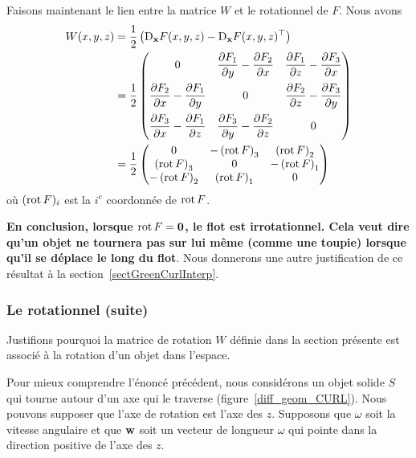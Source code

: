 {Faisons maintenant le lien entre la matrice $W$ et le rotationnel de
$F$.  Nous avons
\begin{align*}
W(x,y,z)
&= \frac{1}{2}
\left( \mathrm{D}_{\mathbf{x}} F(x,y,z) -
\mathrm{D}_{\mathbf{x}} F(x,y,z)^\top \right) \\
&= \frac{1}{2}
\begin{pmatrix}
0 & \displaystyle \frac{\partial F_1}{\partial y} - \frac{\partial F_2}{\partial x} &
\displaystyle \frac{\partial F_1}{\partial z} - \frac{\partial F_3}{\partial x} \\[1em]
\displaystyle \frac{\partial F_2}{\partial x} - \frac{\partial F_1}{\partial y} & 0 &
\displaystyle \frac{\partial F_2}{\partial z} - \frac{\partial F_3}{\partial y} \\[1em]
\displaystyle \frac{\partial F_3}{\partial x} - \frac{\partial F_1}{\partial z} &
\displaystyle \frac{\partial F_3}{\partial y} - \frac{\partial F_2}{\partial z} & 0
\end{pmatrix} \\
&= \frac{1}{2}
\begin{pmatrix}
0 & \displaystyle -\left(\operatorname{rot} F\right)_3 &
\displaystyle \left(\operatorname{rot} F\right)_2 \\
\displaystyle \left(\operatorname{rot} F\right)_3 & 0 &
\displaystyle -\left(\operatorname{rot} F\right)_1 \\
\displaystyle -\left(\operatorname{rot} F\right)_2 & 
\displaystyle \left(\operatorname{rot} F\right)_1 & 0
\end{pmatrix}
\end{align*}
où $(\operatorname{rot} F)_i$ est la $i^e$ coordonnée de
$\operatorname{rot} F$.

{\bfseries En conclusion, lorsque
$\operatorname{rot} F = \mathbf{0}$, le flot est irrotationnel.  Cela veut dire
qu'un objet ne tournera pas sur lui même (comme une toupie) lorsque
qu'il se déplace le long du flot}.  Nous donnerons une autre justification
de ce résultat à la section~\ref{sectGreenCurlInterp}.

\subsubsection{Le rotationnel (suite)}

Justifions pourquoi la matrice de rotation $W$ définie dans la section
présente est associé à la rotation d'un objet dans l'espace.

Pour mieux comprendre l'énoncé précédent, nous considérons un objet
solide $S$ qui tourne autour d'un axe qui le traverse
(figure~\ref{diff_geom_CURL}).  Nous pouvons supposer que
l'axe de rotation est l'axe des $z$.  Supposons que
$\omega$ soit la vitesse angulaire et que $\mathbf{w}$ soit un vecteur de
longueur $\omega$ qui pointe dans la direction positive de l'axe des
$z$.


}
